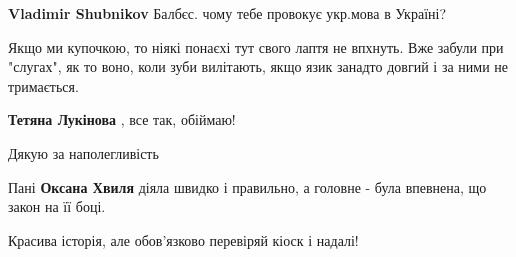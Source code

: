 \begin{itemize}
\begin{itemize}
\textbf{Vladimir Shubnikov} Балбєс. чому тебе провокує укр.мова в Україні?

\end{itemize}

 

Якщо ми купочкою, то ніякі понаєхі тут свого лаптя не впхнуть. Вже забули при
"слугах", як то воно, коли зуби вилітають, якщо язик занадто довгий і за ними
не тримається.

\begin{itemize}
 
\textbf{Тетяна Лукінова} , все так, обіймаю!
\end{itemize}

 
Дякую за наполегливість

 
Пані \textbf{Оксана Хвиля} діяла швидко і правильно, а головне - була впевнена, що закон на її боці.

 
Красива історія, але обов'язково перевіряй кіоск і надалі!

\begin{itemize}
 

\end{itemize}
\end{itemize}
